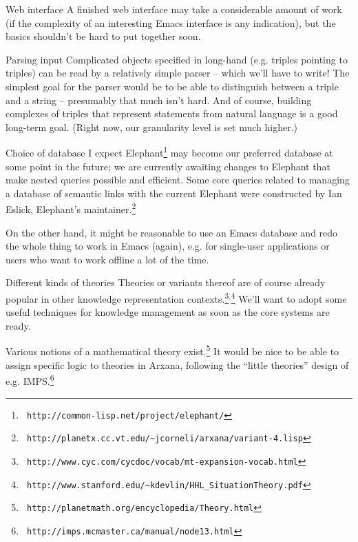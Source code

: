 \begin{notate}{Web interface}
A finished web interface may take a considerable amount of
work (if the complexity of an interesting Emacs interface
is any indication), but the basics shouldn't be hard to
put together soon.
\end{notate}

\begin{notate}{Parsing input} \label{parsing}
Complicated objects specified in long-hand (e.g. triples
pointing to triples) can be read by a relatively simple
parser -- which we'll have to write!  The simplest goal
for the parser would be to be able to distinguish between
a triple and a string -- presumably that much isn't hard.
And of course, building complexes of triples that
represent statements from natural language is a good
long-term goal. (Right now, our granularity level is set
much higher.)
\end{notate}

\begin{notate}{Choice of database} \label{choice-of-database}
I expect Elephant\footnote{{\tt
    http://common-lisp.net/project/elephant/}} may become
our preferred database at some point in the future; we are
currently awaiting changes to Elephant that make nested
queries possible and efficient.  Some core queries related
to managing a database of semantic links with the current
Elephant were constructed by Ian Eslick, Elephant's
maintainer.\footnote{{\tt
    http://planetx.cc.vt.edu/\~{}jcorneli/arxana/variant-4.lisp}}

On the other hand, it might be reasonable to use an Emacs
database and redo the whole thing to work in Emacs
(again), e.g. for single-user applications or users who
want to work offline a lot of the time.
\end{notate}

\begin{notate}{Different kinds of theories}
Theories or variants thereof are of course already popular
in other knowledge representation contexts.\footnote{{\tt
    http://www.cyc.com/cycdoc/vocab/mt-expansion-vocab.html}}$^{,}$\footnote{{\tt
    http://www.stanford.edu/\~{}kdevlin/HHL\_SituationTheory.pdf}}
We'll want to adopt some useful techniques for knowledge
management as soon as the core systems are ready.

Various notions of a mathematical theory
exist.\footnote{{\tt
    http://planetmath.org/encyclopedia/Theory.html}} It
would be nice to be able to assign specific logic to
theories in Arxana, following the ``little theories''
design of e.g. IMPS.\footnote{{\tt
    http://imps.mcmaster.ca/manual/node13.html}}
\end{notate}


